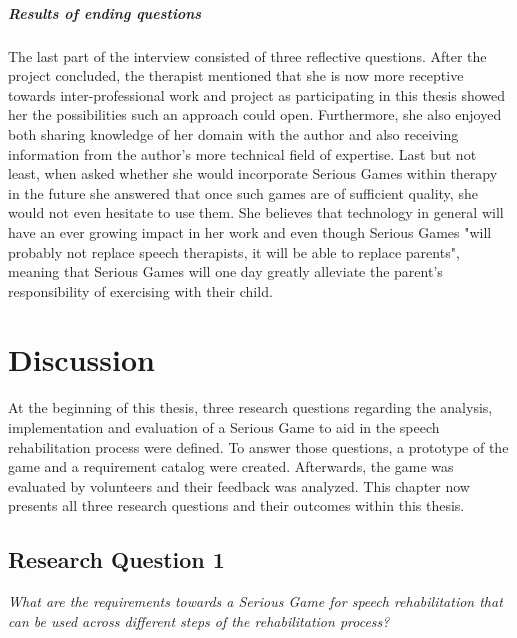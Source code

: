 \documentclass[draft,final]{vutinfth} %
\begin{document}
\paragraph{Results of ending questions}
The last part of the interview consisted of three reflective questions. After the project concluded, the therapist mentioned that she is now more receptive towards inter-professional work and project as participating in this thesis showed her the possibilities such an approach could open. Furthermore, she also enjoyed both sharing knowledge of her domain with the author and also receiving information  from the author's more technical field of expertise. Last but not least, when asked whether she would incorporate Serious Games within therapy in the future she answered that once such games are of sufficient quality, she would not even hesitate to use them. She believes that technology in general will have an ever growing impact in her work and even though Serious Games "will probably not replace speech therapists, it will be able to replace parents", meaning that Serious Games will one day greatly alleviate the parent's responsibility of exercising with their child.

\chapter{Discussion}
\label{chap:discussion}
At the beginning of this thesis, three research questions regarding the analysis, implementation and evaluation of a Serious Game to aid in the speech rehabilitation process were defined. To answer those questions, a prototype of the game and a requirement catalog were created. Afterwards, the game was evaluated by volunteers and their feedback was analyzed. This chapter now presents all three research questions and their outcomes within this thesis.

\section{Research Question 1}
\begin{center}
\emph{What are the requirements towards a Serious Game for speech rehabilitation that can be used across different steps of the rehabilitation process?}
\end{center} 
\end{document}
